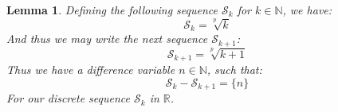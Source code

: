 \documentclass[10pt]{article}
\theoremstyle{plain}
\newtheorem{lemma}[theorem]{Lemma}
\theoremstyle{definition}
\theoremstyle{remark}
\begin{document}
\begin{lemma}
	Defining the following sequence $\mathcal{S}_k$ for $k \in \mathbb{N}$, we have:
	\begin{equation}
		\mathcal{S}_k = \sqrt[p]{k}
	\end{equation}
	And thus we may write the next sequence $\mathcal{S}_{k+1}$:
	\begin{equation}
		\mathcal{S}_{k+1} = \sqrt[p]{k+1}
	\end{equation}
	Thus we have a difference variable $n \in \mathbb{N}$, such that:
	\begin{equation}
		\mathcal{S}_{k} - \mathcal{S}_{k+1} = \{ n \}
	\end{equation}
	For our discrete sequence $\mathcal{S}_k$ in $\mathbb{R}$.
\end{lemma}

\nocite{*}




\end{document}
